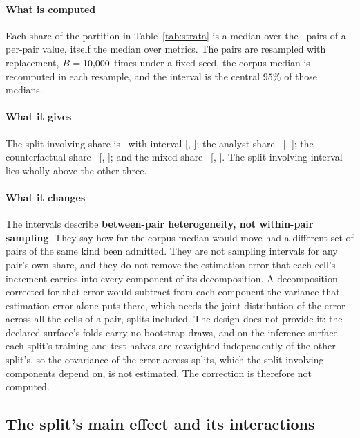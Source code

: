 \paragraph{What is computed}
Each share of the partition in Table~\ref{tab:strata} is a median over the
\nPairs\ pairs of a per-pair value, itself the median over metrics. The pairs
are resampled with replacement, $B = 10{,}000$ times under a fixed seed, the
corpus median is recomputed in each resample, and the interval is the
central $95\%$ of those medians.

\paragraph{What it gives}
The split-involving share is \shareResamplingStratumPct\ with interval
[\shareResamplingStratumLoPct, \shareResamplingStratumHiPct]; the analyst
share \shareAnalystStratumPct\ [\shareAnalystStratumLoPct,
\shareAnalystStratumHiPct]; the counterfactual share
\shareCounterfactualStratumPct\ [\shareCounterfactualStratumLoPct,
\shareCounterfactualStratumHiPct]; and the mixed share
\shareMixedStratumPct\ [\shareMixedStratumLoPct, \shareMixedStratumHiPct].
The split-involving interval lies wholly above the other three.

\paragraph{What it changes}
The intervals describe \textbf{between-pair heterogeneity, not within-pair
sampling}. They say how far the corpus median would move had a different set
of pairs of the same kind been admitted. They are not sampling intervals for
any pair's own share, and they do not remove the estimation error that each
cell's increment carries into every component of its decomposition. A
decomposition corrected for that error would subtract from each component the
variance that estimation error alone puts there, which needs the joint
distribution of the error across all the cells of a pair, splits included.
The design does not provide it: the declared surface's folds carry no
bootstrap draws, and on the inference surface each split's training and test
halves are reweighted independently of the other split's, so the covariance
of the error across splits, which the split-involving components depend on,
is not estimated. The correction is therefore not computed.

\subsection{The split's main effect and its interactions}
\label{app:ijf-split}

